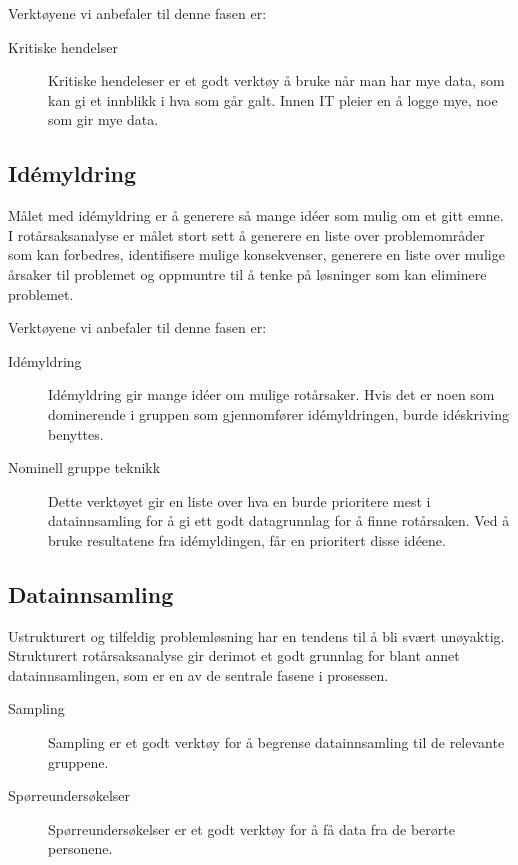 Verktøyene vi anbefaler til denne fasen er: 
\begin{description}
    \item[Kritiske hendelser] Kritiske hendeleser er et godt verktøy å bruke når man har mye data, som kan gi et innblikk i hva som går galt. Innen IT pleier en å logge mye, noe som gir mye data.
\end{description}

\subsection{Idémyldring}
Målet med idémyldring er å generere så mange idéer som mulig om et gitt emne. I rotårsaksanalyse er målet stort sett å generere en liste over problemområder som kan forbedres, identifisere mulige konsekvenser, generere en liste over mulige årsaker til problemet og oppmuntre til å tenke på løsninger som kan eliminere problemet. 

Verktøyene vi anbefaler til denne fasen er:
\begin{description}
    \item[Idémyldring] Idémyldring gir mange idéer om mulige rotårsaker. Hvis det er noen som dominerende i gruppen som gjennomfører idémyldringen, burde idéskriving benyttes.
    \item[Nominell gruppe teknikk] Dette verktøyet gir en liste over hva en burde prioritere mest i datainnsamling for å gi ett godt datagrunnlag for å finne rotårsaken. Ved å bruke resultatene fra idémyldingen, får en prioritert disse idéene. 
\end{description}

\subsection{Datainnsamling}
Ustrukturert og tilfeldig problemløsning har en tendens til å bli svært unøyaktig. Strukturert rotårsaksanalyse gir derimot et godt grunnlag for blant annet datainnsamlingen, som er en av de sentrale fasene i prosessen.

\begin{description}
    \item[Sampling] Sampling er et godt verktøy for å begrense datainnsamling til de relevante gruppene. 
    \item[Spørreundersøkelser] Spørreundersøkelser er et godt verktøy for å få data fra de berørte personene. 
\end{description}

